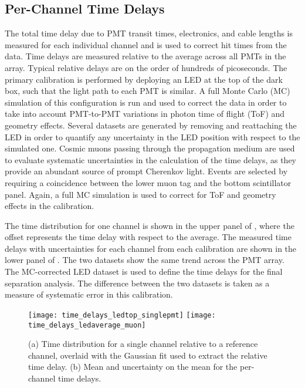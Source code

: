 \subsection{Per-Channel Time Delays}\label{s:delay}

The total time delay due to PMT transit times, electronics, and cable lengths is measured for each individual channel and is used to correct hit times from the data. 
Time delays are measured relative to the average across all PMTs in the array. 
Typical relative delays are on the order of hundreds of picoseconds. 
The primary calibration is performed by deploying an LED at the top of the dark box, such that the light path to each PMT is similar.  A full Monte Carlo (MC) simulation of this configuration is run and used to correct the data in order to take into account PMT-to-PMT variations in photon time of flight (ToF) and geometry effects.  
Several datasets are generated by removing and reattaching the LED in order to quantify any uncertainty in the LED position with respect to the simulated one. 
Cosmic muons passing through the propagation medium are used to evaluate systematic uncertainties in the calculation of the time delays, as they provide an abundant source of prompt Cherenkov light. 
Events are selected  by requiring a coincidence between the lower muon tag and the bottom scintillator panel. 
Again, a full MC simulation is used to correct for ToF and geometry effects in the calibration.  

The time distribution for one channel is shown in the upper panel of , where the offset represents the time delay with respect to the average. 
The measured time delays with uncertainties for each channel from each calibration are shown in the lower panel of .  
The two datasets show the same trend across the PMT array.  
The MC-corrected LED dataset is used to define the time delays for the final separation analysis.
The difference between the two datasets is taken as a measure of  systematic error in this calibration.  

\begin{figure}
\centering
\texttt{[image: time\_delays\_ledtop\_singlepmt]}
\texttt{[image: time\_delays\_ledaverage\_muon]}
\caption{(a) Time distribution for a single channel relative to a reference channel, overlaid with the Gaussian fit used to extract the relative time delay.  (b) Mean and uncertainty on the mean for the per-channel time delays.}
\label{fig:time_delay}
\end{figure}


